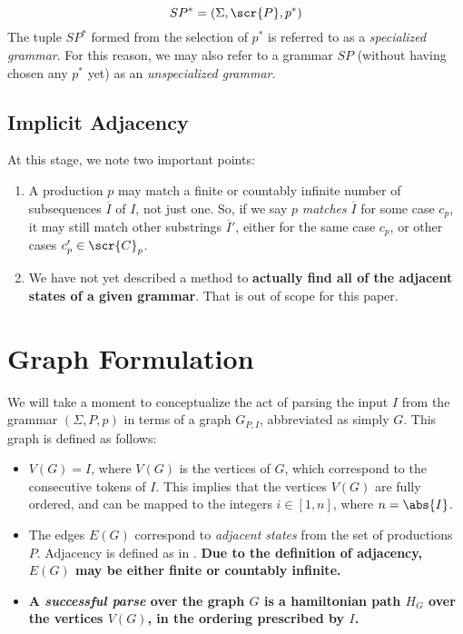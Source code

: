 \documentclass[10pt]{article}
\begin{document}
\begin{equation}
  \label{eq:specialized}
  SP^* = (\Sigma, \scr{P}, p^*)
\end{equation}
The tuple $SP^*$ formed from the selection of $p^*$ is referred to as a \textit{specialized grammar}. For this reason, we may also refer to a grammar $SP$ (without having chosen any $p^*$ yet) as an \textit{unspecialized grammar}.

\subsection{Implicit Adjacency}
At this stage, we note two important points:
\begin{enumerate}
  \item A production $p$ may match a finite or countably infinite number of subsequences $\overbar{I}$ of $I$, not just one. So, if we say $p$ \textit{matches} $\overbar{I}$ for some case $c_p$, it may still match other substrings $\overbar{I}'$, either for the same case $c_p$, or other cases $c'_p \in \scr{C}_p$.
  \item We have not yet described a method to \textbf{actually find all of the adjacent states of a given grammar}. That is out of scope for this paper.
\end{enumerate}

\section{Graph Formulation}
\label{sec:graph-formulation}

We will take a moment to conceptualize the act of parsing the input $I$ from the grammar $(\Sigma, P, p)$ in terms of a graph $G_{P,I}$, abbreviated as simply $G$. This graph is defined as follows:
\begin{itemize}
  \item $V(G) = I$, where $V(G)$ is the vertices of $G$, which correspond to the consecutive tokens of $I$. This implies that the vertices $V(G)$ are fully ordered, and can be mapped to the integers $i \in [1,n]$, where $n = \abs{I}$.
  \item The edges $E(G)$ correspond to \textit{adjacent states} from the set of productions $P$. Adjacency is defined as in . \textbf{Due to the definition of adjacency, $E(G)$ may be either finite or countably infinite.}
  \item \textbf{A \textit{successful parse} over the graph $G$ is a hamiltonian path $H_G$ over the vertices $V(G)$, in the ordering prescribed by $I$.}
\end{itemize}
\end{document}
